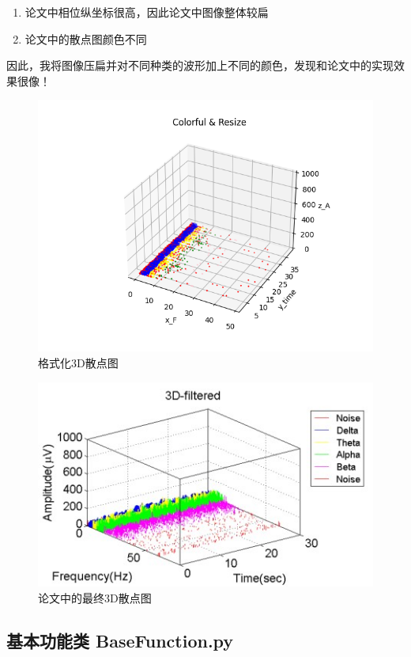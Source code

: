 \documentclass[cs4size,a4paper]{ctexart}
\numberwithin{equation}{section}
\numberwithin{table}{section}
\numberwithin{figure}{section}
\begin{document}
\begin{enumerate}
    \item 论文中相位纵坐标很高，因此论文中图像整体较扁
    \item 论文中的散点图颜色不同
\end{enumerate}

因此，我将图像压扁并对不同种类的波形加上不同的颜色，发现和论文中的实现效果很像！

\begin{figure}[H]
\small
\centering
\includegraphics{3D-formatted.png}
\caption{格式化3D散点图} \label{fig:3D-formatted}
\end{figure}

\begin{figure}[H]
\small
\centering
\includegraphics{3D-paper.jpg}
\caption{论文中的最终3D散点图} \label{fig:3D-paper}
\end{figure}

\subsection{基本功能类 BaseFunction.py}
\end{document}
